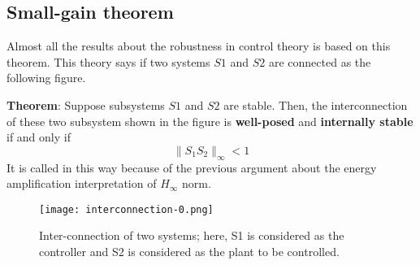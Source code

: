 \subsection{Small-gain theorem}
Almost all the results about the robustness in control theory is based on this theorem. This theory says if two systems $S1$ and $S2$ are connected as the following figure. 

\textbf{Theorem}: Suppose subsystems $S1$ and $S2$ are stable. Then, the interconnection of these two subsystem shown in the figure is \textbf{well-posed} and \textbf{internally stable} if and only if 
\[
\|S_1S_2\|_\infty < 1
\]
It is called in this way because of the previous argument about the energy amplification interpretation of $H_\infty$ norm. 
 \begin{figure}[H]
    \centering
    \texttt{[image: interconnection-0.png]}
    \caption{Inter-connection of two systems; here, S1 is considered as the controller and S2 is considered as the plant to be controlled.}
 \end{figure}


